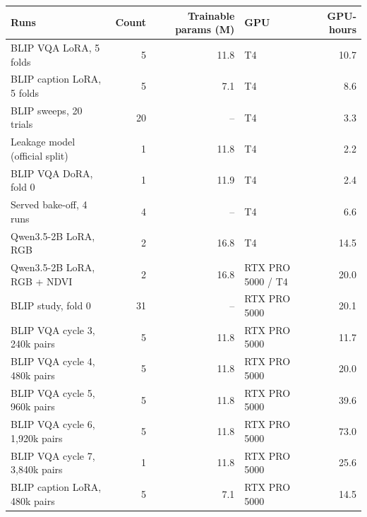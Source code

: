 \begin{tabular}{lrrlr}
\toprule
Runs & Count & Trainable params (M) & GPU & GPU-hours \\
\midrule
BLIP VQA LoRA, 5 folds & 5 & 11.8 & T4 & 10.7 \\
BLIP caption LoRA, 5 folds & 5 & 7.1 & T4 & 8.6 \\
BLIP sweeps, 20 trials & 20 & -- & T4 & 3.3 \\
Leakage model (official split) & 1 & 11.8 & T4 & 2.2 \\
BLIP VQA DoRA, fold 0 & 1 & 11.9 & T4 & 2.4 \\
Served bake-off, 4 runs & 4 & -- & T4 & 6.6 \\
Qwen3.5-2B LoRA, RGB & 2 & 16.8 & T4 & 14.5 \\
Qwen3.5-2B LoRA, RGB + NDVI & 2 & 16.8 & RTX PRO 5000 / T4 & 20.0 \\
BLIP study, fold 0 & 31 & -- & RTX PRO 5000 & 20.1 \\
BLIP VQA cycle 3, 240k pairs & 5 & 11.8 & RTX PRO 5000 & 11.7 \\
BLIP VQA cycle 4, 480k pairs & 5 & 11.8 & RTX PRO 5000 & 20.0 \\
BLIP VQA cycle 5, 960k pairs & 5 & 11.8 & RTX PRO 5000 & 39.6 \\
BLIP VQA cycle 6, 1,920k pairs & 5 & 11.8 & RTX PRO 5000 & 73.0 \\
BLIP VQA cycle 7, 3,840k pairs & 1 & 11.8 & RTX PRO 5000 & 25.6 \\
BLIP caption LoRA, 480k pairs & 5 & 7.1 & RTX PRO 5000 & 14.5 \\
\bottomrule
\end{tabular}
